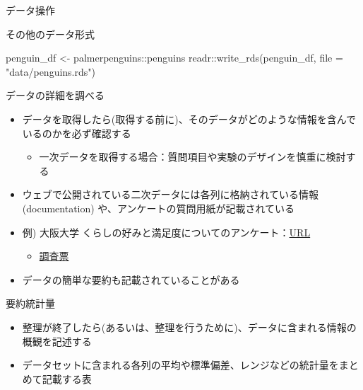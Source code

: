\documentclass[
  ignorenonframetext,
]{beamer}
\newenvironment{Shaded}{\begin{snugshade}}{\end{snugshade}}
\newcommand{\AttributeTok}[1]{\textcolor[rgb]{0.77,0.63,0.00}{#1}}
\newcommand{\FunctionTok}[1]{\textcolor[rgb]{0.00,0.00,0.00}{#1}}
\newcommand{\NormalTok}[1]{#1}
\newcommand{\OtherTok}[1]{\textcolor[rgb]{0.56,0.35,0.01}{#1}}
\newcommand{\SpecialCharTok}[1]{\textcolor[rgb]{0.00,0.00,0.00}{#1}}
\newcommand{\StringTok}[1]{\textcolor[rgb]{0.31,0.60,0.02}{#1}}
\providecommand{\tightlist}{%
  \setlength{\itemsep}{0pt}\setlength{\parskip}{0pt}}
\begin{document}
\begin{frame}[fragile]{データ操作}
\begin{block}{その他のデータ形式}
\begin{Shaded}
\begin{Highlighting}[]
\NormalTok{penguin\_df }\OtherTok{\textless{}{-}}\NormalTok{ palmerpenguins}\SpecialCharTok{::}\NormalTok{penguins}
\NormalTok{readr}\SpecialCharTok{::}\FunctionTok{write\_rds}\NormalTok{(penguin\_df, }\AttributeTok{file =} \StringTok{"data/penguins.rds"}\NormalTok{)}
\end{Highlighting}
\end{Shaded}
\end{block}

\begin{block}{データの詳細を調べる}
\protect\hypertarget{ux30c7ux30fcux30bfux306eux8a73ux7d30ux3092ux8abfux3079ux308b}{}
\begin{itemize}
\tightlist
\item
  データを取得したら(取得する前に)、そのデータがどのような情報を含んでいるのかを必ず確認する

  \begin{itemize}
  \tightlist
  \item
    一次データを取得する場合：質問項目や実験のデザインを慎重に検討する
  \end{itemize}
\item
  ウェブで公開されている二次データには各列に格納されている情報
  (documentation) や、アンケートの質問用紙が記載されている
\item
  例) 大阪大学
  くらしの好みと満足度についてのアンケート：\href{https://www.iser.osaka-u.ac.jp/survey_data/panelsummary.html}{URL}

  \begin{itemize}
  \tightlist
  \item
    \href{https://www.iser.osaka-u.ac.jp/survey_data/doc/japan/questionnaire/japanese/2021QuestionnaireJAPAN.pdf}{調査票}
  \end{itemize}
\item
  データの簡単な要約も記載されていることがある
\end{itemize}
\end{block}

\begin{block}{要約統計量}
\protect\hypertarget{ux8981ux7d04ux7d71ux8a08ux91cf}{}
\begin{itemize}
\tightlist
\item
  整理が終了したら(あるいは、整理を行うために)、データに含まれる情報の概観を記述する
\item
  データセットに含まれる各列の平均や標準偏差、レンジなどの統計量をまとめて記載する表
\end{itemize}


\end{block}
\end{frame}
\end{document}
